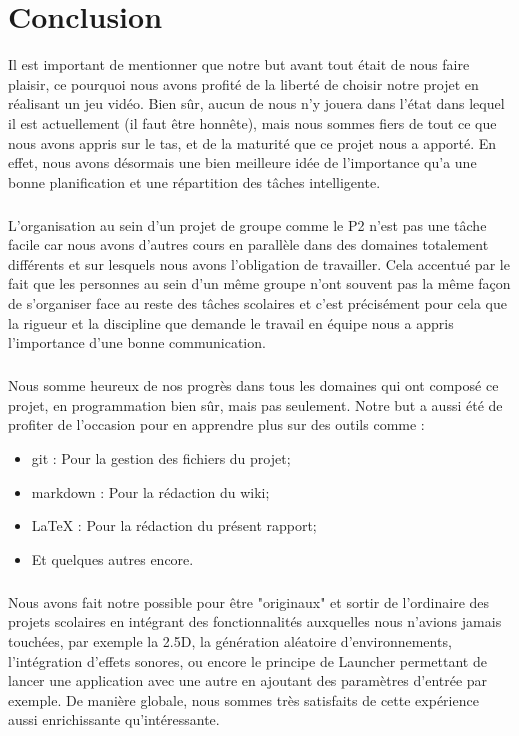 \documentclass[a4paper,10pt,openany,oneside]{report}
\begin{document}
\chapter{Conclusion}
\thispagestyle{headings}
Il est important de mentionner que notre but avant tout était de nous faire plaisir, ce pourquoi nous avons profité de la liberté de choisir notre projet en réalisant un jeu vidéo. Bien sûr, aucun de nous n'y jouera dans l'état dans lequel il est actuellement (il faut être honnête), mais nous sommes fiers de tout ce que nous avons appris sur le tas, et de la maturité que ce projet nous a apporté. En effet, nous avons désormais une bien meilleure idée de l'importance qu'a une bonne planification et une répartition des tâches intelligente.
\paragraph{}
L'organisation au sein d'un projet de groupe comme le P2 n'est pas une tâche facile car nous avons d'autres cours en parallèle dans des domaines totalement différents et sur lesquels nous avons l'obligation de travailler. Cela accentué par le fait que les personnes au sein d'un même groupe n'ont souvent pas la même façon de s'organiser face au reste des tâches scolaires et c'est précisément pour cela que la rigueur et la discipline que demande le travail en équipe nous a appris l'importance d'une bonne communication.
\paragraph{}
Nous somme heureux de nos progrès dans tous les domaines qui ont composé ce projet, en programmation bien sûr, mais pas seulement. Notre but a aussi été de profiter de l'occasion pour en apprendre plus sur des outils comme :
\begin{itemize}
\item git : Pour la gestion des fichiers du projet;
\item markdown : Pour la rédaction du wiki;
\item LaTeX : Pour la rédaction du présent rapport;
\item Et quelques autres encore.
\end{itemize}
\paragraph{}
Nous avons fait notre possible pour être "originaux" et sortir de l'ordinaire des projets scolaires en intégrant des fonctionnalités auxquelles nous n'avions jamais touchées, par exemple la 2.5D, la génération aléatoire d'environnements, l'intégration d'effets sonores, ou encore le principe de Launcher permettant de lancer une application avec une autre en ajoutant des paramètres d'entrée par exemple. De manière globale, nous sommes très satisfaits de cette expérience aussi enrichissante qu'intéressante.
\end{document}
